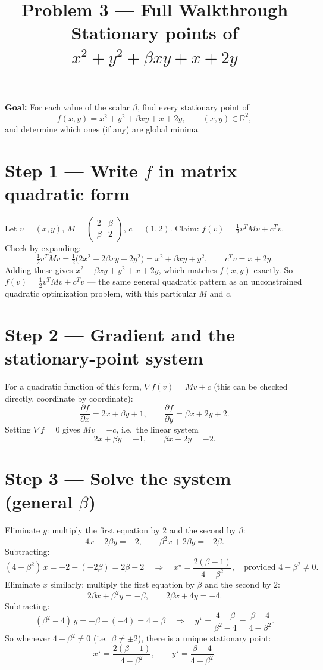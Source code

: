 \documentclass[11pt]{article}
\title{Problem 3 --- Full Walkthrough\\ \large Stationary points of $x^2+y^2+\beta xy+x+2y$}
\author{}
\date{}
\newcommand{\R}{\mathbb{R}}
\begin{document}
\maketitle

\textbf{Goal:} For each value of the scalar $\beta$, find every stationary point of
\[
f(x,y) = x^2+y^2+\beta xy+x+2y, \qquad (x,y)\in\R^2,
\]
and determine which ones (if any) are global minima.

\section*{Step 1 --- Write $f$ in matrix quadratic form}

Let $v=(x,y)$, $M = \begin{pmatrix}2 & \beta \\ \beta & 2\end{pmatrix}$, $c=(1,2)$. Claim: $f(v) = \tfrac12 v^TMv + c^Tv$. Check by expanding:
\[
\tfrac12 v^TMv = \tfrac12\big(2x^2+2\beta xy+2y^2\big) = x^2+\beta xy+y^2, \qquad c^Tv = x+2y.
\]
Adding these gives $x^2+\beta xy+y^2+x+2y$, which matches $f(x,y)$ exactly. So $f(v)=\tfrac12v^TMv+c^Tv$ --- the same general quadratic pattern as an unconstrained quadratic optimization problem, with this particular $M$ and $c$.

\section*{Step 2 --- Gradient and the stationary-point system}

For a quadratic function of this form, $\nabla f(v) = Mv+c$ (this can be checked directly, coordinate by coordinate):
\[
\frac{\partial f}{\partial x} = 2x+\beta y+1, \qquad \frac{\partial f}{\partial y} = \beta x+2y+2.
\]
Setting $\nabla f=0$ gives $Mv=-c$, i.e.\ the linear system
\[
2x+\beta y = -1, \qquad \beta x+2y=-2.
\]

\section*{Step 3 --- Solve the system (general $\beta$)}

Eliminate $y$: multiply the first equation by $2$ and the second by $\beta$:
\[
4x+2\beta y = -2, \qquad \beta^2x+2\beta y = -2\beta.
\]
Subtracting:
\[
(4-\beta^2)\,x = -2-(-2\beta) = 2\beta-2 \quad\Longrightarrow\quad x^\star = \frac{2(\beta-1)}{4-\beta^2}, \quad \text{provided } 4-\beta^2\ne 0.
\]
Eliminate $x$ similarly: multiply the first equation by $\beta$ and the second by $2$:
\[
2\beta x+\beta^2y=-\beta, \qquad 2\beta x+4y=-4.
\]
Subtracting:
\[
(\beta^2-4)\,y = -\beta-(-4) = 4-\beta \quad\Longrightarrow\quad y^\star = \frac{4-\beta}{\beta^2-4} = \frac{\beta-4}{4-\beta^2}.
\]
So whenever $4-\beta^2\ne0$ (i.e.\ $\beta\ne\pm2$), there is a unique stationary point:
\[
x^\star = \frac{2(\beta-1)}{4-\beta^2}, \qquad y^\star = \frac{\beta-4}{4-\beta^2}.
\]
\end{document}
